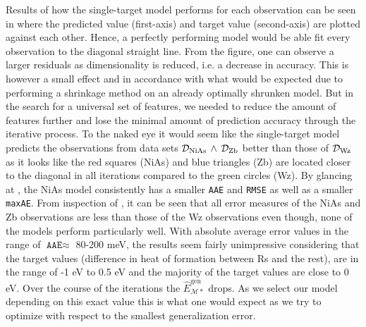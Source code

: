  Results of how the single-target model performs for each observation can be seen in  where the predicted value (first-axis) and target value (second-axis) are plotted against each other. Hence, a perfectly performing model would be able fit every observation to the diagonal straight line. From the figure, one can observe a larger residuals as dimensionality is reduced, i.e. a decrease in accuracy. This is however a small effect and in accordance with what would be expected due to performing a shrinkage method on an already optimally shrunken model. But in the search for a universal set of features, we needed to reduce the amount of features further and lose the minimal amount of prediction accuracy through the iterative process. To the naked eye it would seem like the single-target model predicts the observations from data sets $\mathcal{D}_{\mathrm{NiAs}} \, \wedge \, \mathcal{D}_{\mathrm{Zb}}$ better than those of $\mathcal{D}_{\mathrm{Wz}}$ as it looks like the {\color{red}red squares (NiAs)} and {\color{blue} blue triangles (Zb)} are located closer to the diagonal in all iterations compared to the {\color{green!90!black} green circles (Wz)}. By glancing at , the NiAs model consistently has a smaller \texttt{AAE} and \texttt{RMSE} as well as a smaller \texttt{maxAE}. From inspection of , it can be seen that all error measures of the NiAs and Zb observations are less than those of the Wz observations even though, none of the models perform particularly well. With absolute average error values in the range of $\texttt{AAE} \approx$ 80-200 meV, the results seem fairly unimpressive considering that the target values (difference in heat of formation between Rs and the rest), are in the range of -1 eV to 0.5 eV and the majority of the target values are close to 0 eV. Over the course of the iterations the $\hat{E}_{\mathcal{M}*}^{\mathrm{gen}}$ drops. As we select our model depending on this exact value this is what one would expect as we try to optimize with respect to the smallest generalization error. 
 
